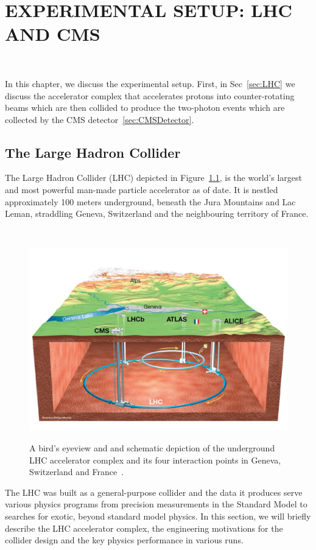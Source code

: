 \chapter{EXPERIMENTAL SETUP: LHC AND CMS}~\label{ch:CMSExperiment}

{\small {}
\vspace{-2ex}
}
\vspace{4ex}

In this chapter, we discuss the experimental setup. First, in Sec~\ref{sec:LHC} we discuss the accelerator complex that accelerates protons into counter-rotating beams which are then collided to produce the two-photon events which are collected by the CMS detector~\ref{sec:CMSDetector}. 

\section{The Large Hadron Collider}
\RaggedRight \parindent=25pt
The Large Hadron Collider (LHC) depicted in Figure~\ref{lhc-overview}, is the world's largest and most powerful man-made particle accelerator as of date. It is nestled approximately 100 meters underground, beneath the Jura Mountains and Lac Leman, straddling Geneva, Switzerland and the neighbouring territory of France.

~\label{sec:LHC}
\begin{figure}[!htbp]
	\centering
     \caption{A bird's eyeview and and schematic depiction of the underground LHC accelerator complex and its four interaction points in Geneva, Switzerland and France~\cite{Mouche:1708847}.}
	\includegraphics[scale=0.3]{fig/lhc_overview.png}
	\label{lhc-overview}
\end{figure}
The LHC was built as a general-purpose collider and the data it produces serve various physics programs from precision measurements in the Standard Model to searches for exotic, beyond standard model physics. In this section, we will briefly describe the LHC accelerator complex, the engineering motivations for the collider design and the key physics performance in various runs.

